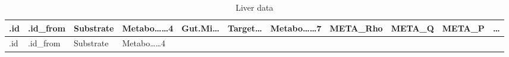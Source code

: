 \documentclass[
]{article}
\begin{document}
\begin{longtable}[]{@{}lllllllllll@{}}
\caption{\label{tab:liver-data}Liver data}\tabularnewline
\toprule
\begin{minipage}[b]{0.03\columnwidth}\raggedright
.id\strut
\end{minipage} & \begin{minipage}[b]{0.07\columnwidth}\raggedright
.id\_from\strut
\end{minipage} & \begin{minipage}[b]{0.07\columnwidth}\raggedright
Substrate\strut
\end{minipage} & \begin{minipage}[b]{0.09\columnwidth}\raggedright
Metabo\ldots\ldots4\strut
\end{minipage} & \begin{minipage}[b]{0.07\columnwidth}\raggedright
Gut.Mi\ldots{}\strut
\end{minipage} & \begin{minipage}[b]{0.07\columnwidth}\raggedright
Target\ldots{}\strut
\end{minipage} & \begin{minipage}[b]{0.09\columnwidth}\raggedright
Metabo\ldots\ldots7\strut
\end{minipage} & \begin{minipage}[b]{0.07\columnwidth}\raggedright
META\_Rho\strut
\end{minipage} & \begin{minipage}[b]{0.07\columnwidth}\raggedright
META\_Q\strut
\end{minipage} & \begin{minipage}[b]{0.07\columnwidth}\raggedright
META\_P\strut
\end{minipage} & \begin{minipage}[b]{0.03\columnwidth}\raggedright
\ldots{}\strut
\end{minipage}\tabularnewline
\midrule
\endfirsthead
\toprule
\begin{minipage}[b]{0.03\columnwidth}\raggedright
.id\strut
\end{minipage} & \begin{minipage}[b]{0.07\columnwidth}\raggedright
.id\_from\strut
\end{minipage} & \begin{minipage}[b]{0.07\columnwidth}\raggedright
Substrate\strut
\end{minipage} & \begin{minipage}[b]{0.09\columnwidth}\raggedright
Metabo\ldots\ldots4\strut

\end{minipage}
\end{longtable}
\end{document}
